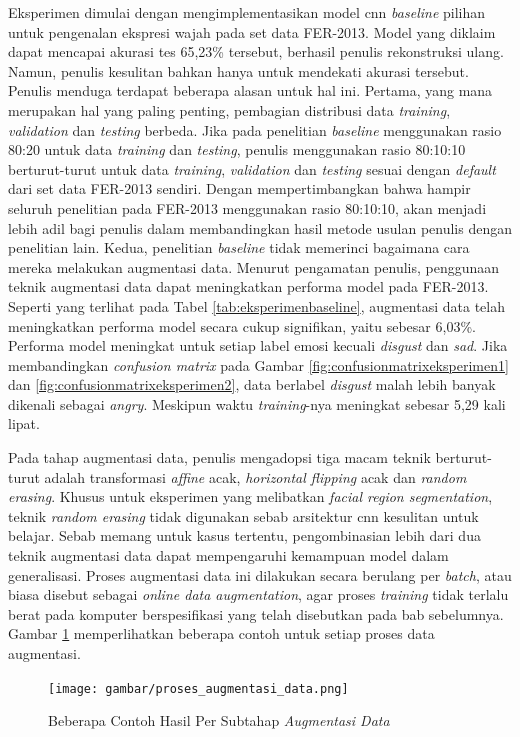 Eksperimen dimulai dengan mengimplementasikan model \acrshort{cnn} \textit{baseline} pilihan untuk pengenalan ekspresi wajah pada set data FER-2013. Model yang diklaim dapat mencapai akurasi tes 65,23\% tersebut, berhasil penulis rekonstruksi ulang. Namun, penulis kesulitan bahkan hanya untuk mendekati akurasi tersebut. Penulis menduga terdapat beberapa alasan untuk hal ini. Pertama, yang mana merupakan hal yang paling penting, pembagian distribusi data \textit{training}, \textit{validation} dan \textit{testing} berbeda. Jika pada penelitian \textit{baseline} menggunakan rasio 80:20 untuk data \textit{training} dan \textit{testing}, penulis menggunakan rasio 80:10:10 berturut-turut untuk data \textit{training}, \textit{validation} dan \textit{testing} sesuai dengan \textit{default} dari set data FER-2013 sendiri. Dengan mempertimbangkan bahwa hampir seluruh penelitian pada FER-2013 menggunakan rasio 80:10:10, akan menjadi lebih adil bagi penulis dalam membandingkan hasil metode usulan penulis dengan penelitian lain. Kedua, penelitian \textit{baseline} tidak memerinci bagaimana cara mereka melakukan augmentasi data. Menurut pengamatan penulis, penggunaan teknik augmentasi data dapat meningkatkan performa model pada FER-2013. Seperti yang terlihat pada Tabel \ref{tab:eksperimenbaseline}, augmentasi data telah meningkatkan performa model secara cukup signifikan, yaitu sebesar 6,03\%. Performa model meningkat untuk setiap label emosi kecuali \textit{disgust} dan \textit{sad}. Jika membandingkan \textit{confusion matrix} pada Gambar \ref{fig:confusionmatrixeksperimen1} dan \ref{fig:confusionmatrixeksperimen2}, data berlabel \textit{disgust} malah lebih banyak dikenali sebagai \textit{angry}. Meskipun waktu \textit{training}-nya meningkat sebesar 5,29 kali lipat.

Pada tahap augmentasi data, penulis mengadopsi tiga macam teknik berturut-turut adalah transformasi \textit{affine} acak, \textit{horizontal flipping} acak dan \textit{random erasing}. Khusus untuk eksperimen yang melibatkan \textit{facial region segmentation}, teknik \textit{random erasing} tidak digunakan sebab arsitektur \acrshort{cnn} kesulitan untuk belajar. Sebab memang untuk kasus tertentu, pengombinasian lebih dari dua teknik augmentasi data dapat mempengaruhi kemampuan model dalam generalisasi. Proses augmentasi data ini dilakukan secara berulang per \textit{batch}, atau biasa disebut sebagai \textit{online data augmentation}, agar proses \textit{training} tidak terlalu berat pada komputer berspesifikasi yang telah disebutkan pada bab sebelumnya. Gambar \ref{fig:prosesaugmentasidata} memperlihatkan beberapa contoh untuk setiap proses data augmentasi.
\begin{figure}[t]
    \centering
    \texttt{[image: gambar/proses\_augmentasi\_data.png]}
    \caption{Beberapa Contoh Hasil Per Subtahap \textit{Augmentasi Data}}
    \label{fig:prosesaugmentasidata}
\end{figure}

